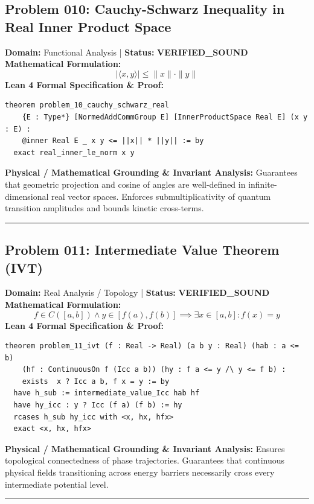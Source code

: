\documentclass[10pt,a4paper]{article}
\begin{document}
\subsection*{Problem 010: Cauchy-Schwarz Inequality in Real Inner Product Space}
\textbf{Domain:} Functional Analysis \quad | \quad \textbf{Status:} \textcolor{green!70!black}{\textbf{VERIFIED\_SOUND}}\\
\textbf{Mathematical Formulation:}
\begin{equation*}
  |\langle x, y \rangle| \le \|x\| \cdot \|y\|
\end{equation*}
\textbf{Lean 4 Formal Specification \& Proof:}
\begin{lstlisting}
theorem problem_10_cauchy_schwarz_real
    {E : Type*} [NormedAddCommGroup E] [InnerProductSpace Real E] (x y : E) :
    @inner Real E _ x y <= ||x|| * ||y|| := by
  exact real_inner_le_norm x y
\end{lstlisting}
\textbf{Physical / Mathematical Grounding \& Invariant Analysis:}
Guarantees that geometric projection and cosine of angles are well-defined in infinite-dimensional real vector spaces. Enforces submultiplicativity of quantum transition amplitudes and bounds kinetic cross-terms.
\vspace{0.8em}\hrule\vspace{0.8em}
\subsection*{Problem 011: Intermediate Value Theorem (IVT)}
\textbf{Domain:} Real Analysis / Topology \quad | \quad \textbf{Status:} \textcolor{green!70!black}{\textbf{VERIFIED\_SOUND}}\\
\textbf{Mathematical Formulation:}
\begin{equation*}
  f \in C([a, b]) \wedge y \in [f(a), f(b)] \implies \exists x \in [a, b]: f(x) = y
\end{equation*}
\textbf{Lean 4 Formal Specification \& Proof:}
\begin{lstlisting}
theorem problem_11_ivt (f : Real -> Real) (a b y : Real) (hab : a <= b) 
    (hf : ContinuousOn f (Icc a b)) (hy : f a <= y /\ y <= f b) : 
    exists  x ? Icc a b, f x = y := by
  have h_sub := intermediate_value_Icc hab hf
  have hy_icc : y ? Icc (f a) (f b) := hy
  rcases h_sub hy_icc with <x, hx, hfx>
  exact <x, hx, hfx>
\end{lstlisting}
\textbf{Physical / Mathematical Grounding \& Invariant Analysis:}
Ensures topological connectedness of phase trajectories. Guarantees that continuous physical fields transitioning across energy barriers necessarily cross every intermediate potential level.
\vspace{0.8em}\hrule\vspace{0.8em}
\end{document}
